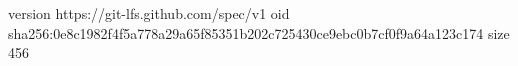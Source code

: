 version https://git-lfs.github.com/spec/v1
oid sha256:0e8c1982f4f5a778a29a65f85351b202c725430ce9ebc0b7cf0f9a64a123c174
size 456
